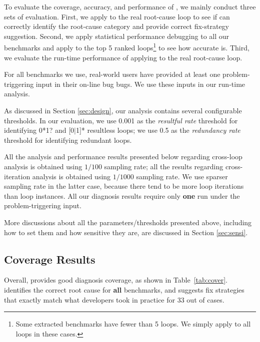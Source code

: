 

To evaluate the coverage, accuracy, and performance of \Tool, we mainly conduct
three sets of evaluation. First, we apply \Tool to the real root-cause loop to
see if \Tool can correctly identify the root-cause category and provide
correct fix-strategy suggestion. Second, we apply
statistical performance debugging \cite{SongOOPSLA2014} to all our benchmarks
and apply \Tool to the top 5 ranked loops\footnote{Some extracted benchmarks
have fewer than 5 loops. We simply apply \Tool to all loops in these cases.}
to see how accurate \Tool is. Third, we evaluate the run-time performance of
applying \Tool to the real root-cause loop. 
 
For all benchmarks we use, real-world
users have provided at least one problem-triggering input in their on-line 
bug bugs. We use these inputs in our run-time analysis.

As discussed in Section \ref{sec:design}, our analysis contains 
several configurable thresholds. In our evaluation,
we use 0.001 as the \textit{resultful rate} threshold for identifying
0*1? 
and [0$|$1]* resultless loops; we use 
0.5 as the \textit{redundancy rate} threshold for identifying redundant loops.

All the analysis and performance results presented below regarding
cross-loop analysis is obtained using $1/100$ sampling rate; all the
results regarding cross-iteration analysis is obtained using $1/1000$ sampling
rate. We use sparser sampling rate in the latter case, because there tend to
be more loop iterations than loop instances.
All our diagnosis results require only \textbf{one} run under the 
problem-triggering input.

More discussions about all the parameters/thresholds presented above, including
how to set them and how sensitive they are, are discussed in Section
\ref{sec:sensi}. 

\subsection{Coverage Results}
\label{sec:coverage}
Overall, \Tool provides good diagnosis coverage, as shown in Table~\ref{tab:cover}. 
\Tool identifies the correct root cause for \textbf{all} \allbugs benchmarks, and 
suggests fix strategies that exactly match what developers took in practice
for 33 out of \allbugs cases. 

